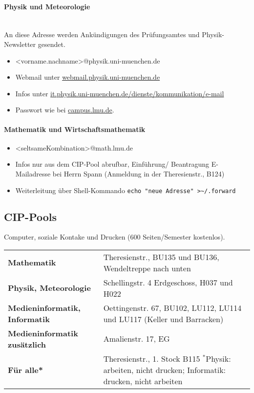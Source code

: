 \paragraph{Physik und Meteorologie}\hfill\\
An diese Adresse werden Ankündigungen des Prüfungsamtes und
Physik-Newsletter gesendet.

\begin{itemize}
	\item <vorname.nachname>@physik.uni-muenchen.de
	\item Webmail unter \url{webmail.physik.uni-muenchen.de}
	\item Infos unter \url{it.physik.uni-muenchen.de/dienste/kommunikation/e-mail}
        \item Passwort wie bei \url{campus.lmu.de}.
\end{itemize}

\paragraph{Mathematik und Wirtschaftsmathematik}
\begin{itemize}
	\item <seltsameKombination>@math.lmu.de
	\item Infos nur aus dem CIP-Pool abrufbar, Einführung/ Beantragung E-Mailadresse bei Herrn Spann (Anmeldung in der Theresienstr., B124)
	\item Weiterleitung über Shell-Kommando \verb|echo "neue Adresse" >~/.forward|
\end{itemize}

\subsection{CIP-Pools}
Computer, soziale Kontake und Drucken (600 Seiten/Semester kostenlos).\\

\begin{tabular}{l p{10cm}}
\textbf{Mathematik}	&	Theresienstr., BU135 und BU136, \newline Wendeltreppe nach unten\\

\textbf{Physik, Meteorologie}	&	Schellingstr. 4 Erdgeschoss, H037 und H022\\
\textbf{Medieninformatik, Informatik}	&	Oettingenstr. 67, BU102, LU112, LU114 und LU117 (Keller und Barracken)\\
\textbf{Medieninformatik zusätzlich}	&	Amalienstr. 17, EG\\
\textbf{Für alle*}	&	Theresienstr., 1. Stock B115\newline
\footnotesize{$^*$Physik: arbeiten, nicht drucken; \newline Informatik: drucken, nicht arbeiten}

\end{tabular}


